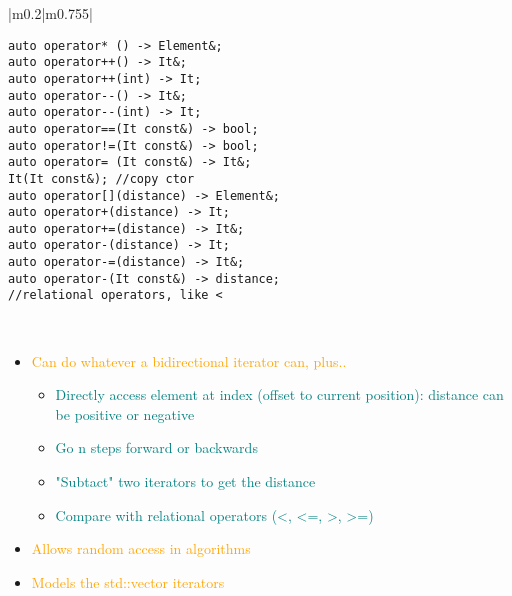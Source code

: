 \documentclass[main.tex,fontsize=8pt,paper=a4,paper=portrait,DIV=calc]{scrartcl}
\begin{document}
\begin{table}[ht!]
\begin{tabular}{|m{0.2\linewidth}|m{0.755\linewidth}|}
\begin{lstlisting}
auto operator* () -> Element&;
auto operator++() -> It&;
auto operator++(int) -> It;
auto operator--() -> It&;
auto operator--(int) -> It;
auto operator==(It const&) -> bool;
auto operator!=(It const&) -> bool;
auto operator= (It const&) -> It&;
It(It const&); //copy ctor
auto operator[](distance) -> Element&;
auto operator+(distance) -> It;
auto operator+=(distance) -> It&;
auto operator-(distance) -> It;
auto operator-=(distance) -> It&;
auto operator-(It const&) -> distance;
//relational operators, like <
\end{lstlisting}
\, \newline
\begin{itemize}
\item \textcolor{orange}{Can do whatever a bidirectional iterator can, plus..}\newline
  \begin{itemize}
  \item \textcolor{teal}{Directly access element at index (offset to current position): distance can be positive or negative}
  \item \textcolor{teal}{Go n steps forward or backwards}
  \item \textcolor{teal}{"Subtact" two iterators to get the distance}
  \item \textcolor{teal}{Compare with relational operators (<, <=, >, >=)}
  \end{itemize} 
\item \textcolor{orange}{Allows random access in algorithms}
\item \textcolor{orange}{Models the std::vector iterators}
\vspace{-2mm}
\end{itemize} \\
\hline
\end{tabular}
\end{table}
\pagebreak
\end{document}
